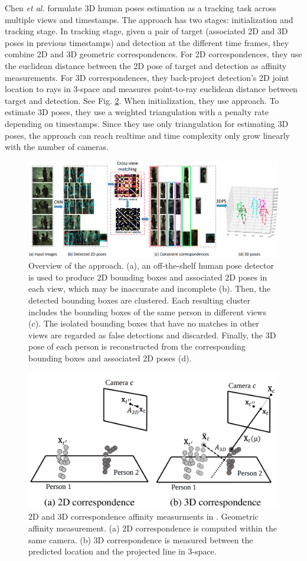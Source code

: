 Chen \textit{et al.} \cite{Chen_2020_CVPR} formulate 3D human poses estimation as a tracking task across multiple views and timestamps. The approach has two stages: initialization and tracking stage. In tracking stage, given a pair of target (associated 2D and 3D poses in previous timestamps) and detection at the different time frames, they combine 2D and 3D geometric correspondences. For 2D correspondences, they use the euclidean distance between the 2D pose of target and detection as affinity measurements. For 3D correspondences, they back-project detection's 2D joint location to rays in 3-space and measures point-to-ray euclidean distance between target and detection. See Fig. \ref{fig:ch3-cheng}. When initialization, they use \cite{dong2019fast} approach. To estimate 3D poses, they use a weighted triangulation with a penalty rate depending on timestamps. Since they use only triangulation for estimating 3D poses, the approach can reach realtime and time complexity only grow linearly with the number of cameras.
\begin{figure}
	\centering
	\includegraphics[width=0.7\columnwidth]{figures/ch3/dong-fast-cross-view-matching.png}
	\caption{Overview of the \cite{dong2019fast} approach. (a), an off-the-shelf human pose detector is used to produce 2D bounding boxes and associated 2D poses in each view, which may be inaccurate and incomplete (b). Then, the detected bounding boxes are clustered. Each resulting cluster includes the bounding boxes of the same person in different views (c). The isolated bounding boxes that have no matches in other views are regarded as false detections and discarded. Finally, the 3D pose of each person is reconstructed from the corresponding bounding boxes and associated 2D poses (d).} 
	\label{fig:ch3-dong-fast-cross-view-matching}
\end{figure}
\begin{figure}
	\centering
	\includegraphics[width=0.7\columnwidth]{figures/ch3/chen-correspondence.png}
	\caption{2D and 3D correspondence affinity measurments in \cite{Chen_2020_CVPR}. Geometric affinity measurement. (a) 2D correspondence is computed within the same camera. (b) 3D correspondence is measured between the predicted location and the projected line in 3-space.} 
	\label{fig:ch3-cheng}
\end{figure}
